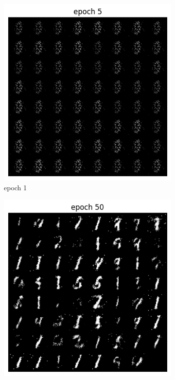\documentclass[a4paper]{article}
\theoremstyle{definition}
\newenvironment{soln}{
	\leavevmode\color{blue}\ignorespaces
}{}
\begin{document}
\begin{enumerate} [label=(\alph*)]
\begin{soln}
		\begin{figure}[H]
			\centering
			\begin{subfigure}[b]{0.3\textwidth}
				\centering
				\includegraphics[width=\textwidth]{epoch_5_q1.png}
				\caption{epoch 1}
			\end{subfigure}
			\hfill
			\begin{subfigure}[b]{0.3\textwidth}
				\centering
				\includegraphics[width=\textwidth]{epoch_50_q1.png}

\end{subfigure}
\end{figure}
\end{soln}
\end{enumerate}
\end{document}
